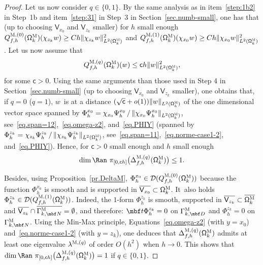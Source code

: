 \begin{proof}
Let us now consider $q\in\{0,1\}$. By the same analysis as in
item~\eqref{step:1b2} in Step~1b and item~\eqref{step:31} in Step~3 in
Section~\ref{sec.numb-small}, one has that (up to choosing $\mathsf V_{x_0}$ and $\mathsf V_{z_k}$ smaller) for $h$ small enough
$ Q_{f,h}^{\textsc{M},(0)}(\mathsf \Omega_k^{\textsc{M}})(\chi_{z_k} w)\ge Ch \Vert \chi_{z_k} w \Vert_{L^2(\mathsf \Omega_k^{\textsc{M}})}^2$
and
$ Q_{f,h}^{\textsc{M},(1)}(\mathsf \Omega_k^{\textsc{M}})(\chi_{x_0} w)\ge Ch \Vert \chi_{x_0} w \Vert_{L^2(\mathsf \Omega_k^{\textsc{M}})}^2$.
Let us now assume that
\[
Q_{f,h}^{\textsc{M},(q)}(\mathsf \Omega_k^{\textsc{M}})(w) \le \mathsf ch\Vert w \Vert_{L^2(\mathsf \Omega_k^{\textsc{M}})}^2,
\]
for some $\mathsf c>0$. Using the same arguments than those used in Step 4 in Section~\ref{sec.numb-small} (up to choosing $\mathsf V_{x_0}$ and $\mathsf V_{z_k}$ smaller), one obtains that, if $q=0$ (\resp $q=1$), $w$~is at a distance $(\sqrt {\mathsf c} +o(1))\Vert w \Vert_{L^2(\mathsf \Omega_k^{\textsc{M}})}$ of the one dimensional vector space spanned by $\Phi_h^{x_0}= \chi_{x_0}\Psi_h^{x_0}\, /\, \Vert \chi_{x_0} \Psi_h^{x_0} \Vert_{L^2(\mathsf \Omega_k^{\textsc{M}})}$, see~\eqref{eq.span=12},~\eqref{eq.omega-z2}, and~\eqref{eq.PHIY} (\resp spanned by $\Phi_h^{z_k}=\chi_{z_k}\Psi_h^{z_k}\, /\, \Vert \chi_{z_k} \Psi_h^{z_k} \Vert_{L^2(\mathsf \Omega_k^{\textsc{M}})}$, see~\eqref{eq.span=11},~\eqref{eq.norme-case1-2}, and~\eqref{eq.PHIY}). Hence, for $\mathsf c>0$ small enough and $h$ small enough
\[
\dim\Ran \ \pi_{[0,\mathsf ch ]}\bigl(\Delta_{f,h}^{\textsc{M},(q)}
(\mathsf \Omega_k^{\textsc{M}})\bigr)\le 1.
\]

Besides, using
Proposition~\ref{pr.DeltaM}, $\Phi_h^{x_0}\in \mathcal
D(Q_{f,h}^{\textsc{M},(0)}(\mathsf \Omega_k^{\textsc{M}}))$ because
the function $\Phi_h^{x_0}$ is smooth and is supported in $\overline
{\mathsf V_{x_0}}\subset \mathsf \Omega_k^{\textsc{M}}$. It~also holds
$\Phi_h^{z_k}\in \mathcal D(Q_{f,h}^{\textsc{M},(1)}(\mathsf
\Omega_k^{\textsc{M}}))$. Indeed, the $1$-form $\Phi_h^{z_k}$ is
smooth, supported in $ \overline {\mathsf V_{z_k}} \subset
\overline{\mathsf \Omega_k^{\textsc{M}}}$ and $\overline {\mathsf
V_{z_k}} \cap \overline{\Gamma_{k,\mbf N}^{\textsc{M}}}=\emptyset$,
and therefore: $\mbf t \Phi_h^{z_k}= 0$ on $\Gamma_{k,\mbf
D}^{\textsc{M}}$ and $\Phi_h^{z_k}=0$ on $\Gamma_{k,\mbf
N}^{\textsc{M}}$. Using the Min-Max principle,
Equations~\eqref{eq.omega-z2} (with $y=x_0$)
and~\eqref{eq.norme-case1-2} (with $y=z_k$), one deduces that
$\Delta_{f,h}^{\textsc{M},(q)}(\mathsf \Omega_k^{\textsc{M}})$
admits at least one eigenvalue $\lambda^{\textsc{M}, (q)}$ of order
$O(h^{2})$ when $h\to 0$. This shows that $\dim\Ran \ \pi_{[0,\mathsf ch ]}\bigl(\Delta_{f,h}^{\textsc{M},(q)}
(\mathsf \Omega_k^{\textsc{M}})\bigr)= 1$ if $q \in \{0,1\}$.


\end{proof}
